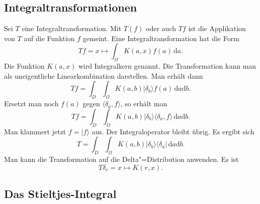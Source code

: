 \documentclass[a4paper,11pt,fleqn,twocolumn,twoside]{scrartcl}
\numberwithin{equation}{section}
\begin{document}
\subsection{Integraltransformationen}

Sei $T$ eine Integraltransformation. Mit $T(f)$ oder auch
$Tf$ ist die Applikation von $T$ auf die Funktion $f$ gemeint.
Eine Integraltransformation hat die Form
\begin{equation}
Tf = x\mapsto \int_{\Omega} K(a,x)f(a)\,\mathrm da.
\end{equation}
%
Die Funktion $K(a,x)$ wird Integralkern genannt. Die Transformation
kann man als uneigentliche Linearkombination darstellen.
Man erhält dann
\begin{equation}
Tf = \int_{D}\int_{\Omega} K(a,b)
|\delta_b\rangle f(a)\,\mathrm da\mathrm db.
\end{equation}
%
Ersetzt man noch $f(a)$ gegen $\langle\delta_a,f\rangle$,
so erhält man
\begin{equation}
Tf = \int_{D}\int_{\Omega} K(a,b)
|\delta_b\rangle\langle\delta_a,f\rangle\,\mathrm da\mathrm db.
\end{equation}
%
Man klammert jetzt $f=|f\rangle$ aus. Der Integraloperator bleibt
übrig. Es ergibt sich
\begin{equation}
T = \int_{D}\int_{\Omega} K(a,b)
|\delta_b\rangle\langle\delta_a|\,\mathrm da\mathrm db.
\end{equation}
%
Man kann die Transformation auf die Delta"=Distribution anwenden.
Es ist
\begin{equation}
T\delta_r = x\mapsto K(r,x).
\end{equation}

\subsection{Das Stieltjes-Integral}
\end{document}
